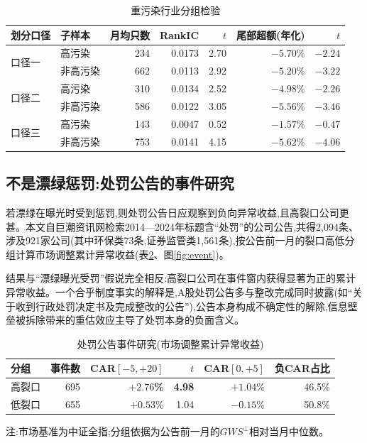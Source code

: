 \documentclass[UTF8, a4paper, fontset=fandol, zihao=-4]{ctexart}
\begin{document}
\begin{table}[H]
\centering
\begin{threeparttable}
\caption{重污染行业分组检验}\label{tab:poll}
\begin{tabular}{llrrrrr}
\toprule
划分口径 & 子样本 & 月均只数 & RankIC & $t$ & 尾部超额(年化) & $t$ \\
\midrule
\multirow{2}{*}{口径一} & 高污染 & 234 & 0.0173 & 2.70 & $-5.70$\% & $-2.24$ \\
 & 非高污染 & 662 & 0.0113 & 2.92 & $-5.20$\% & $-3.22$ \\
\multirow{2}{*}{口径二} & 高污染 & 310 & 0.0134 & 2.52 & $-4.98$\% & $-2.26$ \\
 & 非高污染 & 586 & 0.0122 & 3.05 & $-5.56$\% & $-3.46$ \\
\multirow{2}{*}{口径三} & 高污染 & 143 & 0.0047 & 0.52 & $-1.57$\% & $-0.47$ \\
 & 非高污染 & 753 & 0.0141 & 4.15 & $-5.62$\% & $-4.06$ \\
\bottomrule
\end{tabular}
\end{threeparttable}
\end{table}

\subsection{不是漂绿惩罚:处罚公告的事件研究}

若漂绿在曝光时受到惩罚,则处罚公告日应观察到负向异常收益,且高裂口公司更甚。本文自巨潮资讯网检索2014—2024年标题含“处罚”的公司公告,共得2{,}094条、涉及921家公司(其中环保类73条,证券监管类1{,}561条),按公告前一月的裂口高低分组计算市场调整累计异常收益(表\ref{tab:event}、图\ref{fig:event})。

结果与“漂绿曝光受罚”假说完全相反:高裂口公司在事件窗内获得显著为正的累计异常收益。一个合乎制度事实的解释是,A股处罚公告多与整改完成同时披露(如“关于收到行政处罚决定书及完成整改的公告”),公告本身构成不确定性的解除,信息壁垒被拆除带来的重估效应主导了处罚本身的负面含义。

\begin{table}[H]
\centering
\begin{threeparttable}
\caption{处罚公告事件研究(市场调整累计异常收益)}\label{tab:event}
\begin{tabular}{lrrrrr}
\toprule
分组 & 事件数 & CAR$[-5,+20]$ & $t$ & CAR$[0,+5]$ & 负CAR占比 \\
\midrule
高裂口 & 695 & \textbf{$+2.76$\%} & \textbf{4.98} & $+1.04$\% & 46.5\% \\
低裂口 & 655 & $+0.53$\% & 1.04 & $-0.15$\% & 50.8\% \\
\bottomrule
\end{tabular}
\begin{tablenotes}
\item 注:市场基准为中证全指;分组依据为公告前一月的$GWS^{\perp}$相对当月中位数。
\end{tablenotes}
\end{threeparttable}
\end{table}
\end{document}
